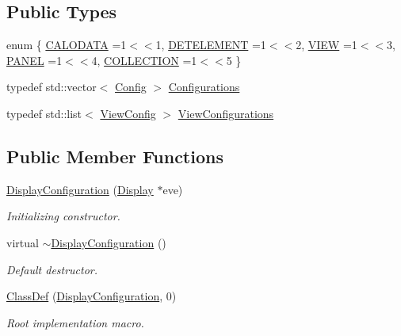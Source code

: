 \subsection*{Public Types}
\begin{DoxyCompactItemize}
\item 
enum \{ \newline
\hyperlink{class_d_d4hep_1_1_display_configuration_a737e6239be43c43453ad6e198ea3e643abcbd85a37c2a19250e645e4713802406}{C\+A\+L\+O\+D\+A\+TA} =1$<$$<$1, 
\hyperlink{class_d_d4hep_1_1_display_configuration_a737e6239be43c43453ad6e198ea3e643acd086f2d94e5029833704a4632bd110a}{D\+E\+T\+E\+L\+E\+M\+E\+NT} =1$<$$<$2, 
\hyperlink{class_d_d4hep_1_1_display_configuration_a737e6239be43c43453ad6e198ea3e643aa8e34c6d660c07116cde351d42dad9af}{V\+I\+EW} =1$<$$<$3, 
\hyperlink{class_d_d4hep_1_1_display_configuration_a737e6239be43c43453ad6e198ea3e643a8d2ce55c420635bef4b36e3f89340419}{P\+A\+N\+EL} =1$<$$<$4, 
\newline
\hyperlink{class_d_d4hep_1_1_display_configuration_a737e6239be43c43453ad6e198ea3e643a19f7e2413bc4870fc2c50ad516fb1f5d}{C\+O\+L\+L\+E\+C\+T\+I\+ON} =1$<$$<$5
 \}
\item 
typedef std\+::vector$<$ \hyperlink{class_d_d4hep_1_1_display_configuration_1_1_config}{Config} $>$ \hyperlink{class_d_d4hep_1_1_display_configuration_ac43586ae2c70f106cc9027d452d383d7}{Configurations}
\item 
typedef std\+::list$<$ \hyperlink{class_d_d4hep_1_1_display_configuration_1_1_view_config}{View\+Config} $>$ \hyperlink{class_d_d4hep_1_1_display_configuration_a38d6c82b57ac859a5d5cf67fe26f4920}{View\+Configurations}
\end{DoxyCompactItemize}
\subsection*{Public Member Functions}
\begin{DoxyCompactItemize}
\item 
\hyperlink{class_d_d4hep_1_1_display_configuration_aa27fd31b55d167964c8d5e6d66c8a597}{Display\+Configuration} (\hyperlink{class_d_d4hep_1_1_display}{Display} $\ast$eve)
\begin{DoxyCompactList}\small\item\em Initializing constructor. \end{DoxyCompactList}\item 
virtual \hyperlink{class_d_d4hep_1_1_display_configuration_a2271117a8a383c48f4f90728974e2b6d}{$\sim$\+Display\+Configuration} ()
\begin{DoxyCompactList}\small\item\em Default destructor. \end{DoxyCompactList}\item 
\hyperlink{class_d_d4hep_1_1_display_configuration_a93b904a9305d5666bef3094fb5db6551}{Class\+Def} (\hyperlink{class_d_d4hep_1_1_display_configuration}{Display\+Configuration}, 0)
\begin{DoxyCompactList}\small\item\em Root implementation macro. \end{DoxyCompactList}\end{DoxyCompactItemize}
